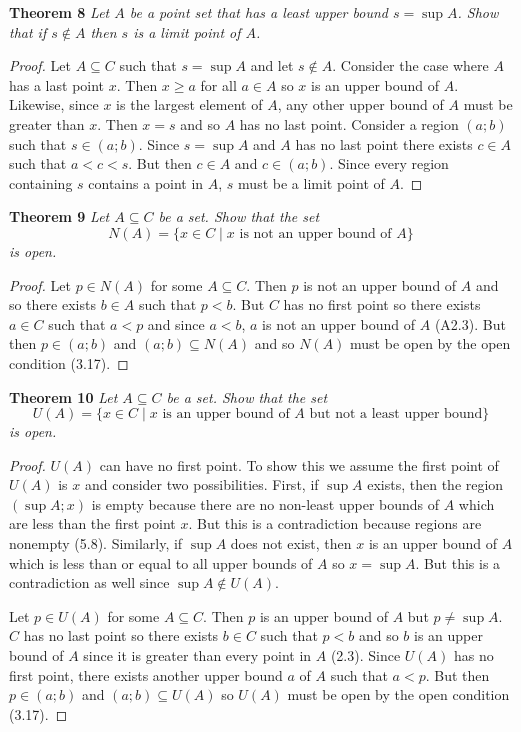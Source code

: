 \documentclass{article}
\begin{document}
\begin{flushleft}
\textbf{Theorem 8}
\textsl{Let $A$ be a point set that has a least upper bound $s = \sup A$. Show that if $s \notin A$ then $s$ is a limit point of $A$.}
\begin{proof}
Let $A \subseteq C$ such that $s = \sup A$ and let $s \notin A$. Consider the case where $A$ has a last point $x$. Then $x \geq a$ for all $a \in A$ so $x$ is an upper bound of $A$. Likewise, since $x$ is the largest element of $A$, any other upper bound of $A$ must be greater than $x$. Then $x = s$ and so $A$ has no last point. Consider a region $(a;b)$ such that $s \in (a;b)$. Since $s = \sup A$ and $A$ has no last point there exists $c \in A$ such that $a < c < s$. But then $c \in A$ and $c \in (a;b)$. Since every region containing $s$ contains a point in $A$, $s$ must be a limit point of $A$.
\end{proof}

\textbf{Theorem 9}
\textsl{Let $A \subseteq C$ be a set. Show that the set
\[
N(A) = \{x \in C \mid x \text{ is not an upper bound of } A\}
\]
is open.}
\begin{proof}
Let $p \in N(A)$ for some $A \subseteq C$. Then $p$ is not an upper bound of $A$ and so there exists $b \in A$ such that $p < b$. But $C$ has no first point so there exists $a \in C$ such that $a<p$ and since $a<b$, $a$ is not an upper bound of $A$ (A2.3). But then $p \in (a;b)$ and $(a;b) \subseteq N(A)$ and so $N(A)$ must be open by the open condition (3.17).
\end{proof}

\textbf{Theorem 10}
\textsl{Let $A \subseteq C$ be a set. Show that the set
\[
U(A) = \{x \in C \mid x \text{ is an upper bound of } A \text{ but not a least upper bound} \}
\]
is open.}
\begin{proof}
$U(A)$ can have no first point. To show this we assume the first point of $U(A)$ is $x$ and consider two possibilities. First, if $\sup A$ exists, then the region $(\sup A;x)$ is empty because there are no non-least upper bounds of $A$ which are less than the first point $x$. But this is a contradiction because regions are nonempty (5.8). Similarly, if $\sup A$ does not exist, then $x$ is an upper bound of $A$ which is less than or equal to all upper bounds of $A$ so $x = \sup A$. But this is a contradiction as well since $\sup A \notin U(A)$.\newline

Let $p \in U(A)$ for some $A \subseteq C$. Then $p$ is an upper bound of $A$ but $p \neq \sup A$. $C$ has no last point so there exists $b \in C$ such that $p<b$ and so $b$ is an upper bound of $A$ since it is greater than every point in $A$ (2.3). Since $U(A)$ has no first point, there exists another upper bound $a$ of $A$ such that $a<p$. But then $p \in (a;b)$ and $(a;b) \subseteq U(A)$ so $U(A)$ must be open by the open condition (3.17).
\end{proof}


\end{flushleft}
\end{document}
